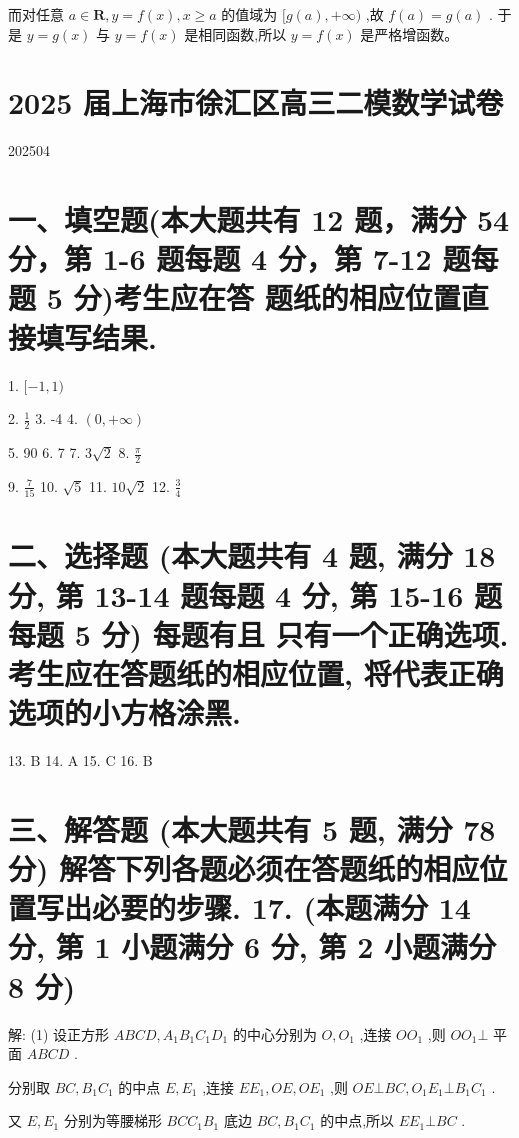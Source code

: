 \documentclass[10pt]{article}
\begin{document}
而对任意 \(a \in  \mathbf{R},y = f\left( x\right) ,x \geq  a\) 的值域为 \(\lbrack g\left( a\right) , + \infty )\) ,故 \(f\left( a\right)  = g\left( a\right)\) . 于是 \(y = g\left( x\right)\) 与 \(y = f\left( x\right)\) 是相同函数,所以 \(y = f\left( x\right)\) 是严格增函数。

\section*{2025 届上海市徐汇区高三二模数学试卷}

202504

\section*{一、填空题(本大题共有 12 题，满分 54 分，第 1-6 题每题 4 分，第 7-12 题每题 5 分)考生应在答 题纸的相应位置直接填写结果.}

1. \(\lbrack  - 1,1)\)

2. \(\frac{1}{2}\) 3. -4 4. \(\left( {0, + \infty }\right)\)

5. 90 6. 7 7. \(3\sqrt{2}\) 8. \(\frac{\pi }{2}\)

9. \(\frac{7}{15}\) 10. \(\sqrt{5}\) 11. \({10}\sqrt{2}\) 12. \(\frac{3}{4}\)

\section*{二、选择题 (本大题共有 4 题, 满分 18 分, 第 13-14 题每题 4 分, 第 15-16 题每题 5 分) 每题有且 只有一个正确选项. 考生应在答题纸的相应位置, 将代表正确选项的小方格涂黑.}

13. B 14. A 15. C 16. B

\section*{三、解答题 (本大题共有 5 题, 满分 78 分) 解答下列各题必须在答题纸的相应位置写出必要的步骤. 17. (本题满分 14 分, 第 1 小题满分 6 分, 第 2 小题满分 8 分)}

解: (1) 设正方形 \({ABCD},{A}_{1}{B}_{1}{C}_{1}{D}_{1}\) 的中心分别为 \(O,{O}_{1}\) ,连接 \(O{O}_{1}\) ,则 \(O{O}_{1} \bot\) 平面 \({ABCD}\) .

分别取 \({BC},{B}_{1}{C}_{1}\) 的中点 \(E,{E}_{1}\) ,连接 \(E{E}_{1},{OE},O{E}_{1}\) ,则 \({OE} \bot  {BC},{O}_{1}{E}_{1} \bot  {B}_{1}{C}_{1}\) .

又 \(E,{E}_{1}\) 分别为等腰梯形 \({BC}{C}_{1}{B}_{1}\) 底边 \({BC},{B}_{1}{C}_{1}\) 的中点,所以 \(E{E}_{1} \bot  {BC}\) .
\end{document}
